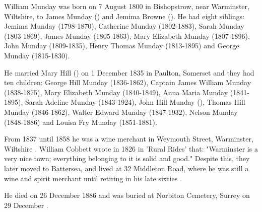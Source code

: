 
William Munday was born on 7 August 1800 \cite{WillMundayBirth} in Bishopstrow, near Warminster, Wiltshire, to James Munday () and Jemima Browne ().  He had eight siblings:  Jemima Munday (1798-1870), Catherine Munday (1802-1883), Sarah Munday (1803-1869), James Munday (1805-1863), Mary Elizabeth Munday (1807-1896), John Munday (1809-1835), Henry Thomas Munday (1813-1895) and George Munday (1815-1830).

He married Mary Hill () on 1 December 1835 in Paulton, Somerset and they had ten children:  George Hill Munday (1836-1862), Captain James William Munday (1838-1875), Mary Elizabeth Munday (1840-1849), Anna Maria Munday (1841-1895), Sarah Adeline Munday (1843-1924), John Hill Munday (), Thomas Hill Munday (1846-1862), Walter Edward Munday (1847-1932), Nelson Munday (1848-1886) and Louisa Fry Munday (1851-1881).

From 1837 until 1858 he was a wine merchant in Weymouth Street, Warminster, Wiltshire \cite{WillMundayOccupation}. William Cobbett wrote in 1826 in 'Rural Rides' that: "Warminster is a very nice town; everything belonging to it is solid and good."   Despite this, they later moved to Battersea, and lived at 32 Middleton Road,  where he was still a wine and spirit merchant until retiring in his late sixties \cite{WillMundayBattersea}.

He died on 26 December 1886 and was buried at Norbiton Cemetery, Surrey on 29 December \cite{WillMundayDeath}.



